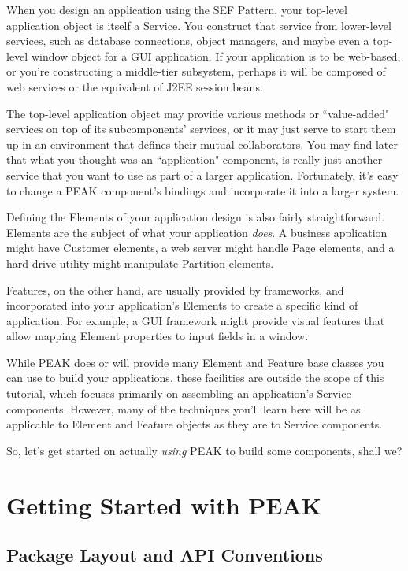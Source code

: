 When you design an application using the SEF Pattern, your top-level 
application object is itself a Service.  You construct that service from
lower-level services, such as database connections, object managers,
and maybe even a top-level window object for a GUI application.  If your
application is to be web-based, or you're constructing a middle-tier
subsystem, perhaps it will be composed of web services or the equivalent
of J2EE session beans.

The top-level application object may provide various methods or ``value-added"
services on top of its subcomponents' services, or it may just serve to start
them up in an environment that defines their mutual collaborators.  You may
find later that what you thought was an ``application" component, is really 
just another service that you want to use as part of a larger application.
Fortunately, it's easy to change a PEAK component's bindings and
incorporate it into a larger system.

Defining the Elements of your application design is also fairly
straightforward.  Elements are the subject of what your application
\emph{does}.  A business application might have Customer elements, a web
server might handle Page elements, and a hard drive utility might manipulate
Partition elements.

Features, on the other hand, are usually provided by frameworks, and
incorporated into your application's Elements to create a specific kind of
application.  For example, a GUI framework might provide visual features that
allow mapping Element properties to input fields in a window.

While PEAK does or will provide many Element and Feature base classes you can
use to build your applications, these facilities are outside the scope of
this tutorial, which focuses primarily on assembling an application's Service
components.  However, many of the techniques you'll learn here will be as
applicable to Element and Feature objects as they are to Service components.

So, let's get started on actually \emph{using} PEAK to build some
components, shall we?






\section{Getting Started with PEAK}

\subsection{Package Layout and API Conventions}

